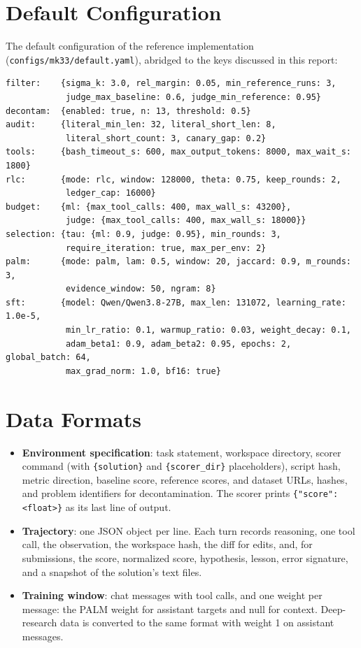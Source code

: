 \documentclass[11pt]{article}
\newcommand{\code}[1]{\texttt{#1}}
\begin{document}



\appendix
\section{Default Configuration}
\label{app:config}
The default configuration of the reference implementation (\code{configs/mk33/default.yaml}), abridged to the keys discussed in this report:
\begin{small}
\begin{verbatim}
filter:    {sigma_k: 3.0, rel_margin: 0.05, min_reference_runs: 3,
            judge_max_baseline: 0.6, judge_min_reference: 0.95}
decontam:  {enabled: true, n: 13, threshold: 0.5}
audit:     {literal_min_len: 32, literal_short_len: 8,
            literal_short_count: 3, canary_gap: 0.2}
tools:     {bash_timeout_s: 600, max_output_tokens: 8000, max_wait_s: 1800}
rlc:       {mode: rlc, window: 128000, theta: 0.75, keep_rounds: 2,
            ledger_cap: 16000}
budget:    {ml: {max_tool_calls: 400, max_wall_s: 43200},
            judge: {max_tool_calls: 400, max_wall_s: 18000}}
selection: {tau: {ml: 0.9, judge: 0.95}, min_rounds: 3,
            require_iteration: true, max_per_env: 2}
palm:      {mode: palm, lam: 0.5, window: 20, jaccard: 0.9, m_rounds: 3,
            evidence_window: 50, ngram: 8}
sft:       {model: Qwen/Qwen3.8-27B, max_len: 131072, learning_rate: 1.0e-5,
            min_lr_ratio: 0.1, warmup_ratio: 0.03, weight_decay: 0.1,
            adam_beta1: 0.9, adam_beta2: 0.95, epochs: 2, global_batch: 64,
            max_grad_norm: 1.0, bf16: true}
\end{verbatim}
\end{small}

\section{Data Formats}
\label{app:formats}
\begin{itemize}
  \item \textbf{Environment specification}: task statement, workspace directory, scorer command (with \code{\{solution\}} and \code{\{scorer\_dir\}} placeholders), script hash, metric direction, baseline score, reference scores, and dataset URLs, hashes, and problem identifiers for decontamination. The scorer prints \code{\{"score": <float>\}} as its last line of output.
  \item \textbf{Trajectory}: one JSON object per line. Each turn records reasoning, one tool call, the observation, the workspace hash, the diff for edits, and, for submissions, the score, normalized score, hypothesis, lesson, error signature, and a snapshot of the solution's text files.
  \item \textbf{Training window}: chat messages with tool calls, and one weight per message: the PALM weight for assistant targets and null for context. Deep-research data is converted to the same format with weight 1 on assistant messages.
\end{itemize}
\end{document}
